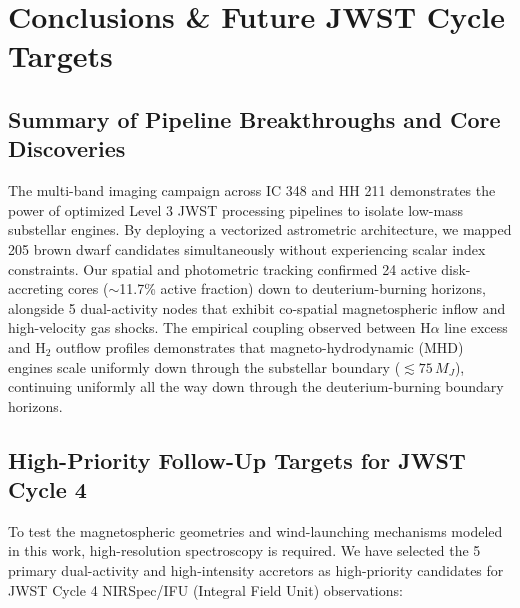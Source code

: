 \documentclass[twocolumn]{aastex63}
\begin{document}
\section{Conclusions \& Future JWST Cycle Targets}
\label{sec:conclusions}

\subsection{Summary of Pipeline Breakthroughs and Core Discoveries}
The multi-band imaging campaign across IC 348 and HH 211 demonstrates the power of optimized Level 3 JWST processing pipelines to isolate low-mass substellar engines. By deploying a vectorized astrometric architecture, we mapped 205 brown dwarf candidates simultaneously without experiencing scalar index constraints. Our spatial and photometric tracking confirmed 24 active disk-accreting cores ($\sim$11.7\% active fraction) down to deuterium-burning horizons, alongside 5 dual-activity nodes that exhibit co-spatial magnetospheric inflow and high-velocity gas shocks. The empirical coupling observed between H$\alpha$ line excess and H$_2$ outflow profiles demonstrates that magneto-hydrodynamic (MHD) engines scale uniformly down through the substellar boundary ($\lesssim 75\,M_J$), continuing uniformly all the way down through the deuterium-burning boundary horizons.

\subsection{High-Priority Follow-Up Targets for JWST Cycle 4}
To test the magnetospheric geometries and wind-launching mechanisms modeled in this work, high-resolution spectroscopy is required. We have selected the 5 primary dual-activity and high-intensity accretors as high-priority candidates for JWST Cycle 4 NIRSpec/IFU (Integral Field Unit) observations:
\end{document}
